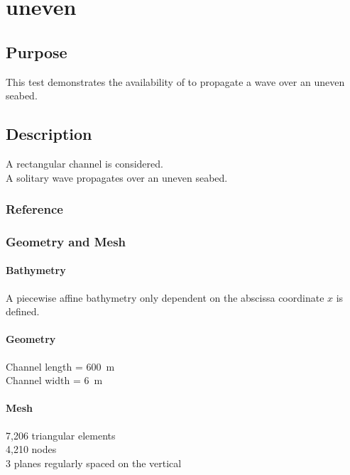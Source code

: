 \chapter{uneven}
%
%
\section{Purpose}
%
This test demonstrates the availability of  to propagate
a wave over an uneven seabed.
%
\section{Description}
%
A rectangular channel is considered.\\
A solitary wave propagates over an uneven seabed.
%
%
%
%
\subsection{Reference}
%

%
%
%
\subsection{Geometry and Mesh}
%
\subsubsection{Bathymetry}
%
A piecewise affine bathymetry only dependent on the abscissa coordinate
$x$ is defined.
%
\subsubsection{Geometry}
%
Channel length = 600~m\\
Channel width = 6~m
%
\subsubsection{Mesh}
%
7,206 triangular elements\\
4,210 nodes\\
3 planes regularly spaced on the vertical
%
%
%
